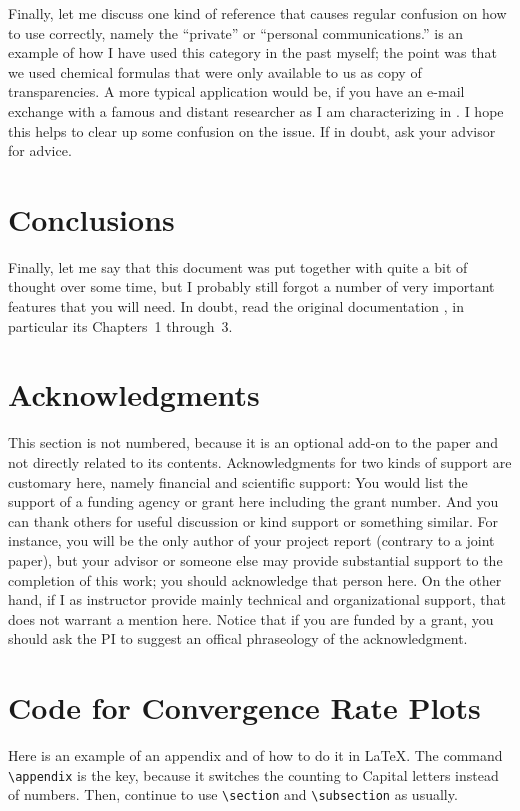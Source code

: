 \documentclass[12pt]{article}
\numberwithin{equation}{section}
\numberwithin{table}{section}
\numberwithin{figure}{section}
\begin{document}
Finally, let me discuss one kind of reference that causes regular
confusion on how to use correctly, namely the ``private'' or ``personal
communications.''
\cite{Ho95} is an example of how I have used this category in the past myself;
the point was that we used chemical formulas that were only
available to us as copy of transparencies. A more typical application
would be, if you have an e-mail exchange with a famous and distant researcher
as I am characterizing in \cite{BigShot}. I hope this helps to clear
up some confusion on the issue. If in doubt, ask your advisor for advice.

\section{Conclusions}

Finally, let me say that this document was put together with quite a bit
of thought over some time, but I probably still forgot a number of very
important features that you will need. In doubt, read the original
documentation \cite{Lamport94}, in particular its Chapters~1 through~3.

\section*{Acknowledgments}

This section is not numbered, because it is an optional add-on to the
paper and not directly related to its contents.
Acknowledgments for two kinds of support are customary here, namely
financial and scientific support: You would list the
support of a funding agency or grant here including the grant number.
And you can thank others for useful discussion or kind support or
something similar. For instance, you will be the only author of your
project report (contrary to a joint paper), but your advisor or
someone else may provide substantial support to the completion of
this work; you should acknowledge that person here. On the other hand,
if I as instructor provide mainly technical and organizational support,
that does not warrant a mention here.
Notice that if you are funded by a grant, you should ask the PI
to suggest an offical phraseology of the acknowledgment.
 
\appendix

\section{Code for Convergence Rate Plots} \label{app:code}

Here is an example of an appendix and of how to do it in \LaTeX.
The command \verb+\appendix+ is the key, because it switches the
counting to Capital letters instead of numbers. Then, continue to
use \verb+\section+ and \verb+\subsection+ as usually.





\end{document}
